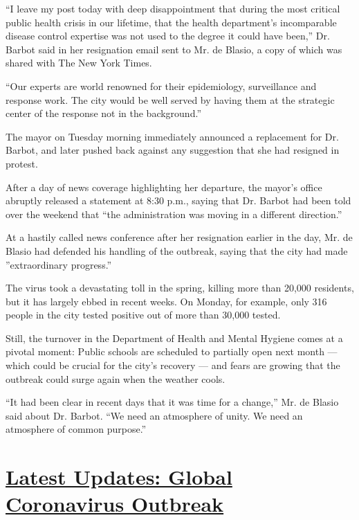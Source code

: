 ``I leave my post today with deep disappointment that during the most
critical public health crisis in our lifetime, that the health
department's incomparable disease control expertise was not used to the
degree it could have been,'' Dr. Barbot said in her resignation email
sent to Mr. de Blasio, a copy of which was shared with The New York
Times.

``Our experts are world renowned for their epidemiology, surveillance
and response work. The city would be well served by having them at the
strategic center of the response not in the background.''

The mayor on Tuesday morning immediately announced a replacement for Dr.
Barbot, and later pushed back against any suggestion that she had
resigned in protest.

After a day of news coverage highlighting her departure, the mayor's
office abruptly released a statement at 8:30 p.m., saying that Dr.
Barbot had been told over the weekend that ``the administration was
moving in a different direction.''

At a hastily called news conference after her resignation earlier in the
day, Mr. de Blasio had defended his handling of the outbreak, saying
that the city had made ''extraordinary progress.''

The virus took a devastating toll in the spring, killing more than
20,000 residents, but it has largely ebbed in recent weeks. On Monday,
for example, only 316 people in the city tested positive out of more
than 30,000 tested.

Still, the turnover in the Department of Health and Mental Hygiene comes
at a pivotal moment: Public schools are scheduled to partially open next
month --- which could be crucial for the city's recovery --- and fears
are growing that the outbreak could surge again when the weather cools.

``It had been clear in recent days that it was time for a change,'' Mr.
de Blasio said about Dr. Barbot. ``We need an atmosphere of unity. We
need an atmosphere of common purpose.''

\hypertarget{latest-updates-global-coronavirus-outbreak}{%
\section{\texorpdfstring{\href{https://www.nytimes3xbfgragh.onion/2020/08/04/world/coronavirus-cases.html?action=click\&pgtype=Article\&state=default\&region=MAIN_CONTENT_1\&context=storylines_live_updates}{Latest
Updates: Global Coronavirus
Outbreak}}{Latest Updates: Global Coronavirus Outbreak}}\label{latest-updates-global-coronavirus-outbreak}}

